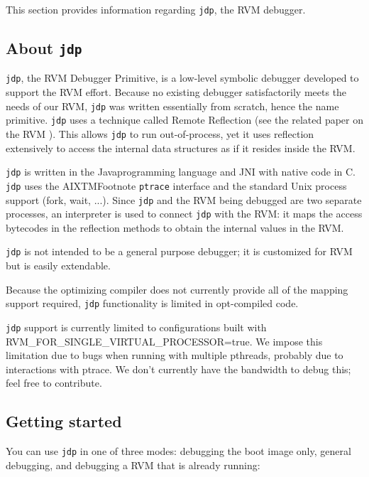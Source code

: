 This section provides information regarding {\tt jdp}, the RVM
debugger.

\subsection{About {\tt jdp}}

{\tt jdp}, the RVM Debugger Primitive, is a low-level symbolic debugger 
developed to support the
RVM effort.  Because no existing debugger satisfactorily meets the
needs of our RVM, {\tt jdp} was written essentially from scratch, hence the
name primitive.  {\tt jdp} uses a technique called Remote
Reflection (see the related paper on the RVM 
).  This
allows {\tt jdp} to run out-of-process, yet it uses reflection extensively to
access the internal data structures as if it resides inside the RVM.

{\tt jdp} is written in the Java\JavaTMFootnote programming language
and JNI with native code in C.  {\tt jdp} 
uses the
AIXTMFootnote {\tt ptrace} interface and the standard Unix process
support (fork, wait, ...).  
Since {\tt jdp} and
the RVM being debugged are two separate processes, an interpreter is
used to connect {\tt jdp} with the RVM:  it maps the access bytecodes in the
reflection methods to obtain the internal values in the RVM.
  
{\tt jdp} is not intended to be a general purpose debugger; it is 
customized for RVM but is easily extendable.  

Because the optimizing compiler does not currently provide all of
the mapping support required, {\tt jdp} functionality is limited in
opt-compiled code. 

{\tt jdp} support is currently limited to configurations built with
RVM\_FOR\_SINGLE\_VIRTUAL\_PROCESSOR=true.  We impose this limitation due
to bugs when running with multiple pthreads, probably due to interactions
with ptrace.  We don't currently have the bandwidth to debug this; feel
free to contribute.

\JavaTMFooter

\AIXTMFooter

\subsection{Getting started}

  You can use {\tt jdp} in one of three modes: debugging the boot image only, 
general debugging, and debugging a RVM that is already running:

